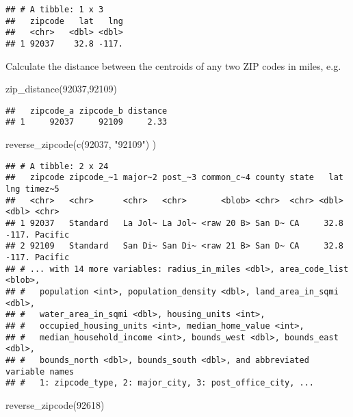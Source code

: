 \documentclass[
]{article}
\newenvironment{Shaded}{\begin{snugshade}}{\end{snugshade}}
\newcommand{\FunctionTok}[1]{\textcolor[rgb]{0.00,0.00,0.00}{#1}}
\newcommand{\NormalTok}[1]{#1}
\newcommand{\StringTok}[1]{\textcolor[rgb]{0.31,0.60,0.02}{#1}}
\begin{document}
\begin{verbatim}
## # A tibble: 1 x 3
##   zipcode   lat   lng
##   <chr>   <dbl> <dbl>
## 1 92037    32.8 -117.
\end{verbatim}

Calculate the distance between the centroids of any two ZIP codes in
miles, e.g.

\begin{Shaded}
\begin{Highlighting}[]
\FunctionTok{zip\_distance}\NormalTok{(}\StringTok{\textquotesingle{}92037\textquotesingle{}}\NormalTok{,}\StringTok{\textquotesingle{}92109\textquotesingle{}}\NormalTok{)}
\end{Highlighting}
\end{Shaded}

\begin{verbatim}
##   zipcode_a zipcode_b distance
## 1     92037     92109     2.33
\end{verbatim}

\begin{Shaded}
\begin{Highlighting}[]
\FunctionTok{reverse\_zipcode}\NormalTok{(}\FunctionTok{c}\NormalTok{(}\StringTok{\textquotesingle{}92037\textquotesingle{}}\NormalTok{, }\StringTok{"92109"}\NormalTok{) )}
\end{Highlighting}
\end{Shaded}

\begin{verbatim}
## # A tibble: 2 x 24
##   zipcode zipcode_~1 major~2 post_~3 common_c~4 county state   lat   lng timez~5
##   <chr>   <chr>      <chr>   <chr>       <blob> <chr>  <chr> <dbl> <dbl> <chr>  
## 1 92037   Standard   La Jol~ La Jol~ <raw 20 B> San D~ CA     32.8 -117. Pacific
## 2 92109   Standard   San Di~ San Di~ <raw 21 B> San D~ CA     32.8 -117. Pacific
## # ... with 14 more variables: radius_in_miles <dbl>, area_code_list <blob>,
## #   population <int>, population_density <dbl>, land_area_in_sqmi <dbl>,
## #   water_area_in_sqmi <dbl>, housing_units <int>,
## #   occupied_housing_units <int>, median_home_value <int>,
## #   median_household_income <int>, bounds_west <dbl>, bounds_east <dbl>,
## #   bounds_north <dbl>, bounds_south <dbl>, and abbreviated variable names
## #   1: zipcode_type, 2: major_city, 3: post_office_city, ...
\end{verbatim}

\begin{Shaded}
\begin{Highlighting}[]
\FunctionTok{reverse\_zipcode}\NormalTok{(}\StringTok{\textquotesingle{}92618\textquotesingle{}}\NormalTok{)}
\end{Highlighting}
\end{Shaded}
\end{document}
